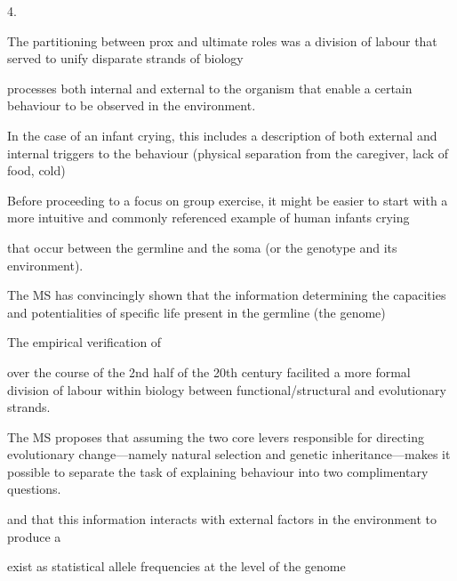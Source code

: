4.



The partitioning between prox and ultimate roles was a division of labour that served to unify disparate strands of biology

processes both internal and external to the organism that enable a certain behaviour to be observed in the environment.

In the case of an infant crying, this includes a description of both external and internal triggers to the behaviour (physical separation from the caregiver, lack of food, cold)

Before proceeding to a focus on group exercise, it might be easier to start with a more intuitive and commonly referenced example of human infants crying

that occur between the germline and the soma (or the genotype and its environment).

The MS has convincingly shown that the information determining the capacities and potentialities of specific life present in the germline (the genome)



The empirical verification of


over the course of the 2nd half of the 20th century facilited a more formal division of labour within biology between functional/structural and evolutionary strands.




The MS proposes that assuming the two core levers responsible for directing evolutionary change---namely natural selection and genetic inheritance---makes it possible to separate the task of explaining behaviour into two complimentary questions.


and that this information interacts with external factors in the environment to produce a


exist as statistical allele frequencies at the level of the genome


